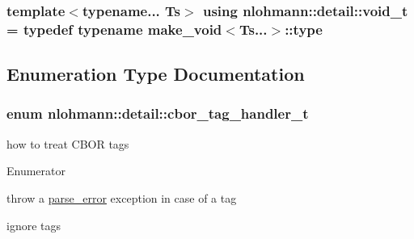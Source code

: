 \subsubsection[{\texorpdfstring{void\+\_\+t}{void_t}}]{\setlength{\rightskip}{0pt plus 5cm}template$<$typename... Ts$>$ using {\bf nlohmann\+::detail\+::void\+\_\+t} = typedef typename {\bf make\+\_\+void}$<$Ts...$>$\+::type}\hypertarget{namespacenlohmann_1_1detail_a92a167c49c6697b6ffe4f79492c705e5}{}\label{namespacenlohmann_1_1detail_a92a167c49c6697b6ffe4f79492c705e5}


\subsection{Enumeration Type Documentation}
\subsubsection[{\texorpdfstring{cbor\+\_\+tag\+\_\+handler\+\_\+t}{cbor_tag_handler_t}}]{\setlength{\rightskip}{0pt plus 5cm}enum {\bf nlohmann\+::detail\+::cbor\+\_\+tag\+\_\+handler\+\_\+t}\hspace{0.3cm}{\ttfamily [strong]}}\hypertarget{namespacenlohmann_1_1detail_a58bb1ef1a9ad287a9cfaf1855784d9ac}{}\label{namespacenlohmann_1_1detail_a58bb1ef1a9ad287a9cfaf1855784d9ac}


how to treat C\+B\+OR tags 

\begin{Desc}
\item[Enumerator]\par
\begin{description}
\item[{\em 
error\hypertarget{namespacenlohmann_1_1detail_a58bb1ef1a9ad287a9cfaf1855784d9acacb5e100e5a9a3e7f6d1fd97512215282}{}\label{namespacenlohmann_1_1detail_a58bb1ef1a9ad287a9cfaf1855784d9acacb5e100e5a9a3e7f6d1fd97512215282}
}]throw a \hyperlink{classnlohmann_1_1detail_1_1parse__error}{parse\+\_\+error} exception in case of a tag \item[{\em 
ignore\hypertarget{namespacenlohmann_1_1detail_a58bb1ef1a9ad287a9cfaf1855784d9aca567bc1d268f135496de3d5b946b691f3}{}\label{namespacenlohmann_1_1detail_a58bb1ef1a9ad287a9cfaf1855784d9aca567bc1d268f135496de3d5b946b691f3}
}]ignore tags \end{description}
\end{Desc}

